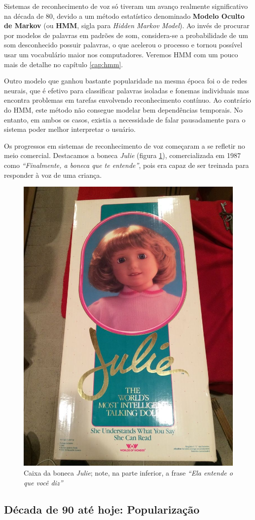 Sistemas de reconhecimento de voz só tiveram um avanço realmente significativo na década de 80, devido a um método estatístico denominado \textbf{Modelo Oculto de Markov} (ou \textbf{HMM}, sigla para \textit{Hidden Markov Model}). Ao invés de procurar por modelos de palavras em padrões de som, considera-se a probabilidade de um som desconhecido possuir palavras, o que acelerou o processo e tornou possível usar um vocabulário maior nos computadores. Veremos HMM com um pouco mais de detalhe no capítulo \ref{cap:hmm}.

Outro modelo que ganhou bastante popularidade na mesma época foi o de redes neurais, que é efetivo para classificar palavras isoladas e fonemas individuais mas encontra problemas em tarefas envolvendo reconhecimento contínuo. Ao contrário do HMM, este método não consegue modelar bem dependências temporais. No entanto, em ambos os casos, existia a necessidade de falar pausadamente para o sistema poder melhor interpretar o usuário.

Os progressos em sistemas de reconhecimento de voz começaram a se refletir no meio comercial. Destacamos a boneca \textit{Julie} (figura \ref{julie}), comercializada em 1987 como \textit{``Finalmente, a boneca que te entende''}, pois era capaz de ser treinada para responder à voz de uma criança.

\begin{figure}[H]
  \centering
  \includegraphics[width=.35\textwidth]{image/julie.jpg}
  \caption{Caixa da boneca \textit{Julie}; note, na parte inferior, a frase \textit{``Ela entende o que você diz''} \citep{julieImage}}
  \label{julie}
\end{figure}


\subsection{Década de 90 até hoje: Popularização}

